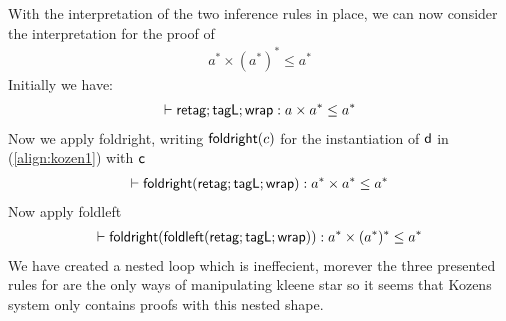 \documentclass[a4paper,UKenglish,cleveref, autoref, thm-restate]{lipics-v2021}
\begin{document}
With the interpretation of the two inference rules in place, we can now consider the interpretation for the proof of
\begin{align}
a ^* \times (a^*)^* \leq a^*
\end{align}
Initially we have: 
\begin{align}
\contains{}{\dslcom{retag};\dslcom{tagL};\dslcom{wrap}}{a \times a^*}{a^*}
\end{align}
Now we apply \textsf{foldright}, writing $\textsf{foldright}(c)$ for the instantiation of $\textsf{d}$ in (\ref{align:kozen1}) with $\textsf{c}$
\begin{align}
\contains{}{\dslcom{foldright}(\dslcom{retag};\dslcom{tagL};\dslcom{wrap})}{a^* \times a^*}{a^*}
\end{align}
Now apply \textsf{foldleft}
\begin{align}
\contains{}{\dslcom{foldright}(\dslcom{foldleft}(\dslcom{retag};\dslcom{tagL};\dslcom{wrap}))}{a^* \times (a^*)^*}{a^*}
\end{align}
We have created a nested loop which is ineffecient, morever the three presented rules for are the only ways of manipulating kleene star so it seems that Kozens system only contains proofs with this nested shape.
\end{document}
